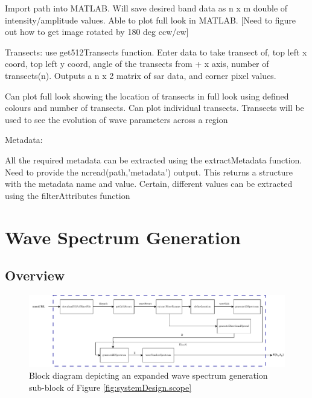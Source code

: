 Import path into MATLAB. Will save desired band data as n x m double of intensity/amplitude values. Able to plot full look in MATLAB. [Need to figure out how to get image rotated by 180 deg ccw/cw]

Transects:
use get512Transects function. Enter data to take transect of, top left x coord, top left y coord, angle of the transects from + x axis, number of transects(n). Outputs a n x 2 matrix of sar data, and corner pixel values.

Can plot full look showing the location of transects in full look using defined colours and number of transects. Can plot individual transects. Transects will be used to see the evolution of wave parameters across a region

Metadata:

All the required metadata can be extracted using the extractMetadata function. Need to provide the ncread(path,'metadata') output. This returns a structure with the metadata name and value. Certain, different values can be extracted using the filterAttributes function

\section{Wave Spectrum Generation} \label{sec:systemDesign.waveSpectrum}



\subsection{Overview} \label{subsec:systemDesign.waveSpectrum.Overview}

\begin{figure}[H]
    \centering
    \includegraphics[width=.95\linewidth]{Figures/PipelineDesign/wave_spectrum.pdf}
    \caption{Block diagram depicting an expanded wave spectrum generation sub-block of Figure \ref{fig:systemDesign.scope}}
    \label{fig:systemDesign.wavesSpectrum.blockDiagram}
\end{figure}


